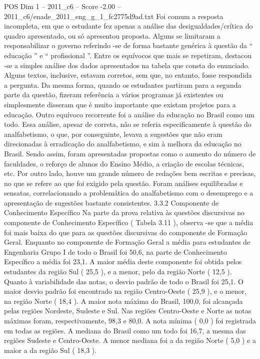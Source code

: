 \begin{textsample}{POS Dim 1 – 2011\_c6 – Score -2.00 – 2011\_c6/enade\_2011\_eng\_g\_1\_fc2775d9ad.txt}
Foi comum a resposta incompleta, em que o estudante fez apenas a análise das desigualdades/crítica do quadro apresentado, ou só apresentou proposta.
Alguns se limitaram a responsabilizar o governo referindo -se de forma bastante genérica à questão da “ educação ” e “ profissional ”.
Entre os equívocos que mais se repetiram, destacou -se a simples análise dos dados apresentados na tabela que consta do enunciado.
Alguns textos, inclusive, estavam corretos, sem que, no entanto, fosse respondida a pergunta.
Da mesma forma, quando os estudantes partiram para a segunda parte da questão, fizeram referência a vários programas já existentes ou simplesmente disseram que é muito importante que existam projetos para a educação.
Outro equívoco recorrente foi a análise da educação no Brasil como um todo.
Essa análise, apesar de correta, não se referia especificamente à questão do analfabetismo, o que, por conseguinte, levava a sugestões que não eram direcionadas à erradicação do analfabetismo, e sim à melhora da educação no Brasil.
Sendo assim, foram apresentadas propostas como o aumento do número de faculdades, o reforço de alunos do Ensino Médio, a criação de escolas técnicas, etc.
Por outro lado, houve um grande número de redações bem escritas e precisas, no que se refere ao que foi exigido pela questão.
Foram análises equilibradas e sensatas, correlacionando a problemática do analfabetismo com o desemprego e a apresentação de sugestões bastante consistentes. 3.3.2 Componente de Conhecimento Específico Na parte da prova relativa às questões discursivas no componente de Conhecimento Específico ( Tabela 3.11 ), observa -se que a média foi mais baixa do que para as questões discursivas do componente de Formação Geral.
Enquanto no componente de Formação Geral a média para estudantes de Engenharia Grupo I de todo o Brasil foi 50,6, na parte de Conhecimento Específico a média foi 23,1.
A maior média deste componente foi obtida pelos estudantes da região Sul ( 25,5 ), e a menor, pelo da região Norte ( 12,5 ).
Quanto à variabilidade das notas, o desvio padrão de todo o Brasil foi 25,1.
O maior desvio padrão foi encontrado na região Centro-Oeste ( 25,9 ), e o menor, na região Norte ( 18,4 ).
A maior nota máxima do Brasil, 100,0, foi alcançada pelas regiões Nordeste, Sudeste e Sul.
Nas regiões Centro-Oeste e Norte as notas máximas foram, respectivamente, 98,3 e 80,0.
A nota mínima ( 0,0 ) foi registrada em todas as regiões.
A mediana do Brasil como um todo foi 16,7, a mesma das regiões Sudeste e Centro-Oeste.
A menor mediana foi a da região Norte ( 5,0 ) e a maior a da região Sul ( 18,3 ).

\end{textsample}
